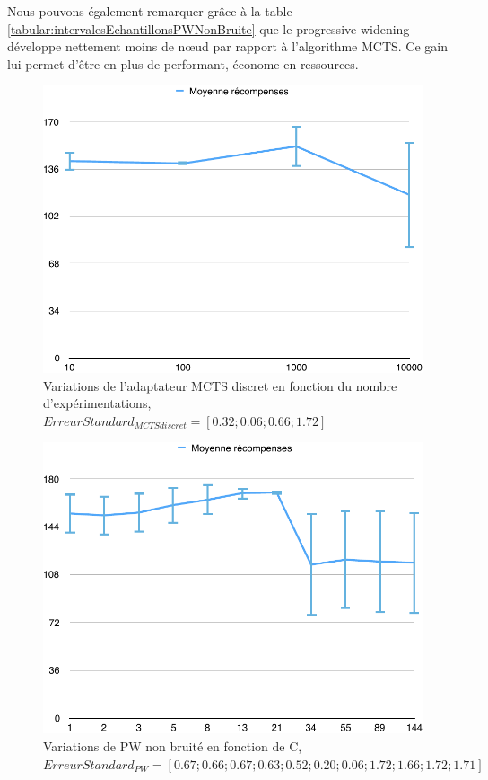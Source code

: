 \documentclass[pdftex,french, english]{article}	%
\begin{document}
    Nous pouvons également remarquer grâce à la table  \ref{tabular:intervalesEchantillonsPWNonBruite} que le progressive widening développe nettement moins de nœud par rapport à l'algorithme MCTS. Ce gain lui permet d'être en plus de performant, économe en ressources.
    
    \begin{figure}[H]
		\centering
		\includegraphics[width=\textwidth]{AdapterNonBruite.pdf}
		\caption{Variations de l'adaptateur MCTS discret en fonction du nombre d’expérimentations, $ErreurStandard_{MCTSdiscret} = [0.32 ; 0.06 ; 0.66 ; 1.72]$}
		 \label{fig:adapterNonBruite}
	\end{figure}
    
    \begin{figure}[H]
		\centering
		\includegraphics[width=\textwidth]{PWNonBruite.pdf}
		\caption{Variations de PW non bruité en fonction de C, $ErreurStandard_{PW} = [0.67 ; 0.66; 0.67 ; 0.63 ; 0.52 ; 0.20 ; 0.06 ; 1.72 ; 1.66 ; 1.72 ; 1.71]$}
		 \label{fig:pwNonBruite}
	\end{figure}
    
\end{document}
